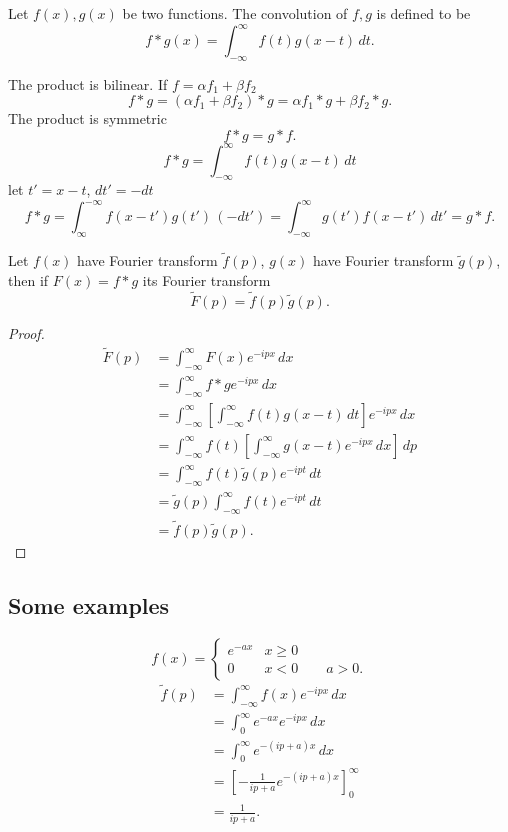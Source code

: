 \documentclass[10pt, a4paper]{article}
\begin{document}
\begin{definition}[Convolution]
    Let $f(x), g(x)$ be two functions.
    The convolution of $f, g$ is defined to be
    \[
    f * g(x) = \int_{-\infty}^{\infty}f(t)g(x - t)\,dt.
    \]
\end{definition}
The product is bilinear.
If $f = \alpha f_1 + \beta f_2$
\[
f * g = (\alpha f_1 + \beta f_2) * g = \alpha f_1 * g + \beta f_2 * g.
\]
The product is symmetric
\[
f * g = g * f.
\]
\[
f * g = \int_{-\infty}^{\infty}f(t)g(x - t)\,dt
\]
let $t' = x - t$,
$dt' = -dt$
\[
f * g = \int_{\infty}^{-\infty}f(x - t')g(t')\,(-dt') = \int_{-\infty}^{\infty}g(t')f(x - t')\,dt' = g * f.
\]

\begin{theorem}
    Let $f(x)$ have Fourier transform $\tilde{f}(p)$,
    $g(x)$ have Fourier transform $\tilde{g}(p)$,
    then if $F(x) = f * g$ its Fourier transform
    \[
    \tilde{F}(p) = \tilde{f}(p)\tilde{g}(p).
    \]

    \begin{proof}
        \begin{align*}
            \tilde{F}(p) &= \int_{-\infty}^{\infty}F(x)e ^ {-ipx}\,dx \\
            &= \int_{-\infty}^{\infty}f * ge ^ {-ipx}\,dx \\
            &= \int_{-\infty}^{\infty}\left[\int_{-\infty}^{\infty}f(t)g(x - t)\,dt\right]e ^ {-ipx}\,dx \\
            &= \int_{-\infty}^{\infty}f(t)\left[\int_{-\infty}^{\infty}g(x - t)e ^ {-ipx}\,dx\right]\,dp \\
            &= \int_{-\infty}^{\infty}f(t)\tilde{g}(p)e ^ {-ipt}\,dt \\
            &= \tilde{g}(p)\int_{-\infty}^{\infty}f(t)e ^ {-ipt}\,dt \\
            &= \tilde{f}(p)\tilde{g}(p).
        \end{align*}
        \[
        \]
    \end{proof}
\end{theorem}

\subsection{Some examples}

\begin{example}
    \[
    f(x) = \begin{cases}
        e ^ {-ax} & x \geq 0 \\
        0 & x < 0\qquad a > 0.
    \end{cases}
    \]
    \begin{align*}
        \tilde{f}(p) &= \int_{-\infty}^{\infty}f(x)e ^ {-ipx}\,dx \\
        &= \int_{0}^{\infty}e ^ {-ax}e ^ {-ipx}\,dx \\
        &= \int_{0}^{\infty}e ^ {-(ip + a)x}\,dx \\
        &= \left[-\frac{1}{ip + a}e ^ {-(ip + a)x}\right]_{0}^{\infty} \\
        &= \frac{1}{ip + a}.
    \end{align*}
\end{example}
\end{document}

